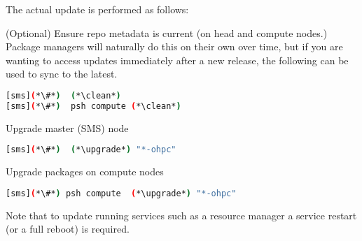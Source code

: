 The actual update is performed as follows:
\begin{enumerate*}
\item (Optional) Ensure repo metadata is current (on head and compute nodes.)
  Package managers will naturally do this on their own over time,
  but if you are wanting to access updates immediately after a new release,
  the following can be used to sync to the latest.

\begin{lstlisting}[language=bash,keywords={}]
[sms](*\#*)  (*\clean*)
[sms](*\#*)  psh compute (*\clean*)
\end{lstlisting}

\item Upgrade master (SMS) node

\begin{lstlisting}[language=bash,keywords={}]
[sms](*\#*)  (*\upgrade*) "*-ohpc"
\end{lstlisting}

\item Upgrade packages on compute nodes

\begin{lstlisting}[language=bash,keywords={}]
[sms](*\#*) psh compute  (*\upgrade*) "*-ohpc"
\end{lstlisting}


\end{enumerate*}

\noindent Note that to update running services such as a resource manager a
service restart (or a full reboot) is required.

